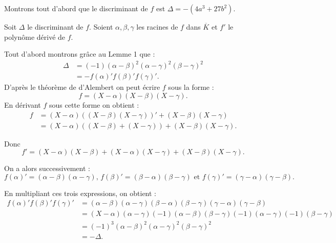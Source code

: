 \begin{demonstration}
    Montrons tout d'abord que le discriminant de $f$ est $\Delta= -(4a^3 + 27b^2)$.

    Soit $\Delta$ le discriminant de $f$. Soient $\alpha, \beta, \gamma $ les racines de $f$ dans $\overline{K}$ et $f'$ le polynôme dérivé de $f$.

    Tout d'abord montrons grâce au Lemme 1 que :
    \begin{align*}
        \Delta &= (-1) ( \alpha - \beta )^2 ( \alpha - \gamma )^2 ( \beta - \gamma )^2 \\
          &= - f(\alpha)'f(\beta )'f(\gamma)'
    .\end{align*}
    D'après le théorème de d'Alembert on peut écrire $f$ sous la forme :
    \[
        f = \left( X - \alpha \right) \left( X - \beta \right) \left( X - \gamma \right) 
    .\] 
    En dérivant $f$ sous cette forme on obtient :
    \begin{align*}
        f &= ( X - \alpha ) \left( ( X - \beta ) ( X - \gamma ) \right)'  + ( X - \beta ) ( X - \gamma )\\
          &= ( X - \alpha ) \left( ( X - \beta ) + ( X - \gamma ) \right) + ( X - \beta ) ( X - \gamma ) 
    .\end{align*}

    Donc  
\[
f' = ( X - \alpha ) ( X - \beta ) + ( X - \alpha ) ( X - \gamma ) + ( X - \beta ) ( X - \gamma )
.\] 

On a alors successivement : 
\[
    f(\alpha)' = ( \alpha - \beta) ( \alpha - \gamma ) \text{, } f(\beta )' = ( \beta - \alpha) ( \beta - \gamma) \text{ et } f(\gamma)' = ( \gamma - \alpha) ( \gamma - \beta)
.\] 

En multipliant ces trois expressions, on obtient :
\begin{align*}
    f(\alpha)' f(\beta )' f(\gamma)' &= ( \alpha - \beta ) ( \alpha - \gamma ) ( \beta - \alpha ) ( \beta - \gamma) ( \gamma - \alpha ) ( \gamma - \beta ) \\
&= \left( X - \alpha \right) \left( \alpha - \gamma \right) \left( -1 \right) \left( \alpha - \beta  \right) \left( \beta - \gamma \right) \left( -1 \right) \left( \alpha - \gamma \right) \left( -1 \right) \left( \beta - \gamma \right) \\
&= \left( -1 \right) ^3 \left( \alpha - \beta  \right) ^2 \left( \alpha - \gamma  \right) ^2 \left( \beta - \gamma \right) ^2\\
 &= - \Delta
.\end{align*}


\end{demonstration}
